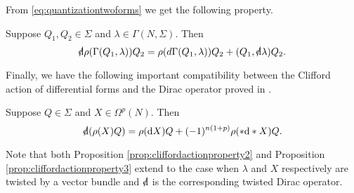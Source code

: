 \documentclass[10pt, oneside]{article}
\begin{document}
From \eqref{eq:quantizationtwoforms} we get the following property.

\begin{prop}
Suppose $Q_1,Q_2\in\Sigma$ and $\lambda\in\Gamma(N, \Sigma)$. Then
\[\sd{\d}\rho(\Gamma(Q_1, \lambda)) Q_2 = \rho(d \Gamma(Q_1, \lambda)) Q_2 + (Q_1, \sd{\d} \lambda) Q_2.\]
\label{prop:cliffordactionproperty2}
\end{prop}

Finally, we have the following important compatibility between the Clifford action of differential forms and the Dirac operator proved in \cite[equation 7.6]{Snygg}.

\begin{prop}
Suppose $Q\in\Sigma$ and $X\in\Omega^p(N)$. Then
\[\sd{\d}(\rho(X) Q) = \rho(\d X)Q + (-1)^{n(1+p)}\rho(\ast \d\ast X) Q.\]
\label{prop:cliffordactionproperty3}
\end{prop}

Note that both Proposition \ref{prop:cliffordactionproperty2} and Proposition \ref{prop:cliffordactionproperty3} extend to the case when $\lambda$ and $X$ respectively are twisted by a vector bundle and $\sd{\d}$ is the corresponding twisted Dirac operator.

\pagestyle{bib}
\printbibliography
\end{document}
